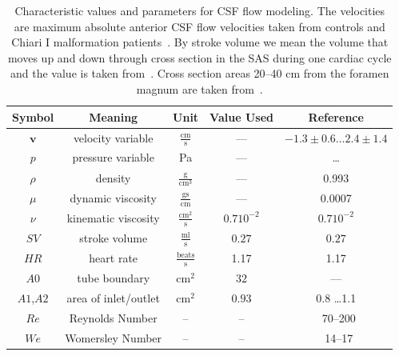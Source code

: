 \begin{table}
\begin{center}
    \begin{tabular}{ | c | c | c | c | c | }
    \hline
    Symbol & Meaning & Unit & Value Used & Reference \\ \hline\hline
	$\mathbf{v}$	& velocity variable & $\mathrm{ \frac{cm}{s}}$ & --- & $-1.3\pm 0.6 \ldots 2.4 \pm 1.4$  \\
	$p$		& pressure	variable & Pa & --- & \ldots\\
	$\rho$	& density & $\mathrm{\frac{g}{cm^3}}$ & --- &0.993 \\ %
	$\mu$	& dynamic viscosity	&  $\mathrm{\frac{g s}{cm}}$ & --- & 0.0007\\
	$\nu$	& kinematic viscosity & $\mathrm{ \frac{cm^2}{s}}$ & $0.7 10^{-2}$ & $0.7 10^{-2}$ \\ 	\hline %
	$SV$	& stroke volume 	& $\mathrm{ \frac{ml}{s}}$& $0.27$  & $0.27$ \\
	$HR$	& heart rate & $\mathrm{\frac{beats}{s}}$	& 1.17 & 1.17\\
	$A0$	& tube boundary	& $\mathrm{ cm^2}$ & $32$  & ---\\
	$A1$,$A2$	& area of inlet/outlet & $\mathrm{ cm^2}$ &$0.93$ & 0.8 \ldots 1.1   \\
    \hline
    $Re$    & Reynolds Number & -- & -- & ~70--200 \\
    $We$    & Womersley Number & -- & -- & ~14--17 \\
    \hline
    \end{tabular}
	\label{tab:entities}
\vspace{1cm}
\caption{
Characteristic values and parameters for CSF flow modeling.
The velocities are maximum absolute anterior CSF flow velocities  taken from controls 
and Chiari I malformation patients~\citep{HofmannWarmuth-MetzBendszusEtAl2000}.
By stroke volume we mean the volume that moves up and down through cross section in 
the SAS during one cardiac cycle and the value is taken
from~\citep{GuptaSoellingerBoesigerEtAl2009}.
Cross section areas  20--40 cm from the foramen magnum are taken
from~\citep{LothYardimciAlperin2001}.
}
\end{center}
\end{table}

\vspace{6cm}

